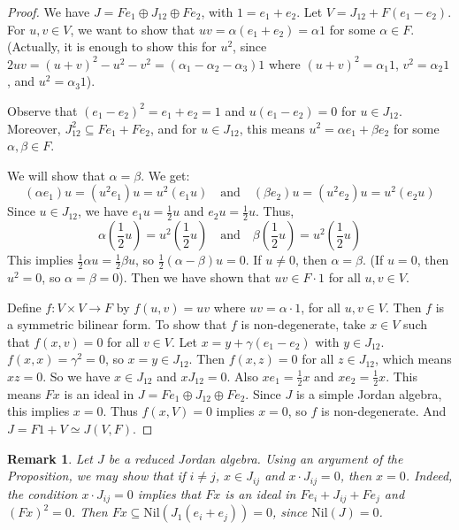 \documentclass{article}
\newtheorem{remark}[theorem]{Remark}
\begin{document}
\begin{proof}  
We have $J = Fe_1 \oplus J_{12} \oplus Fe_2$, with $1 = e_1 + e_2$. Let $V = J_{12} + F(e_1-e_2)$. For $u,v \in V$, we want to show that $uv = \alpha(e_1+e_2) = \alpha 1$ for some $\alpha \in F$. (Actually, it is enough to show this for $u^2$, since $2uv = (u+v)^2 - u^2 - v^2 = (\alpha_1 - \alpha_2 - \alpha_3)1$ where $(u+v)^2 = \alpha_1 1$, $v^2 = \alpha_2 1$, and $u^2 = \alpha_3 1$).  

Observe that $(e_1-e_2)^2 = e_1+e_2=1$ and $u(e_1-e_2) = 0$ for $u \in J_{12}$. Moreover, $J_{12}^2 \subseteq Fe_1 + Fe_2$, and for $u \in J_{12}$, this means $u^2 = \alpha e_1 + \beta e_2$ for some $\alpha, \beta \in F$.  

We will show that $\alpha=\beta$. We get:  
\[ (\alpha e_1)u = (u^2 e_1)u = u^2(e_1 u) \quad \text{and} \quad (\beta e_2)u = (u^2 e_2)u = u^2(e_2 u) \]  
Since $u \in J_{12}$, we have $e_1 u = \frac{1}{2}u$ and $e_2 u = \frac{1}{2}u$. Thus,  
\[ \alpha(\frac{1}{2}u) = u^2(\frac{1}{2}u) \quad \text{and} \quad \beta(\frac{1}{2}u) = u^2(\frac{1}{2}u) \]  
This implies $\frac{1}{2}\alpha u = \frac{1}{2}\beta u$, so $\frac{1}{2}(\alpha-\beta)u = 0$. If $u \ne 0$, then $\alpha = \beta$. (If $u=0$, then $u^2=0$, so $\alpha=\beta=0$). Then we have shown that $uv \in F \cdot 1$ for all $u,v \in V$.  

Define $f: V \times V \to F$ by $f(u,v) = uv$ where $uv = \alpha \cdot 1$, for all $u,v \in V$. Then $f$ is a symmetric bilinear form. To show that $f$ is non-degenerate, take $x \in V$ such that $f(x,v)=0$ for all $v \in V$. Let $x = y + \gamma(e_1-e_2)$ with $y \in J_{12}$. $f(x, x) = \gamma^2 = 0$, so $x=y \in J_{12}$. Then $f(x, z) = 0$ for all $z \in J_{12}$, which means $xz=0$. So we have $x \in J_{12}$ and $x J_{12} = 0$. Also $x e_1 = \frac{1}{2}x$ and $x e_2 = \frac{1}{2}x$. This means $F x$ is an ideal in $J = Fe_1 \oplus J_{12} \oplus Fe_2$. Since $J$ is a simple Jordan algebra, this implies $x=0$. Thus $f(x,V)=0$ implies $x=0$, so $f$ is non-degenerate. And $ J=F1+V \simeq J(V,F) $.  
\end{proof}  

\begin{remark}  
Let $J$ be a reduced Jordan algebra. Using an argument of the Proposition, we may show that if $i \ne j$, $x \in J_{ij}$ and $x \cdot J_{ij}=0$, then $x=0$. Indeed, the condition $x \cdot J_{ij}=0$ implies that $Fx$ is an ideal in $Fe_i + J_{ij} + Fe_j$ and $(Fx)^2=0$. Then $Fx \subseteq \mathrm{Nil}(J_1(e_i+e_j))=0$, since $\mathrm{Nil}(J)=0$.  
\end{remark}  
\end{document}
